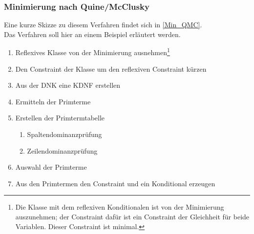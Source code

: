 \documentclass[draft]{scrreprt}
\begin{document}
\subsubsection{Minimierung nach Quine/McClusky} \label{Min_Besch_QMC} 
Eine kurze Skizze zu diesem Verfahren findet sich in \ref{Min_QMC}.\\
Das Verfahren soll hier an einem Beispiel erläutert werden.
\begin{enumerate}
	\item Reflexives Klasse von der Minimierung ausnehmen\footnote{Die Klasse mit dem reflexiven Konditionalen ist von der Minimierung auszunehmen; der Constraint dafür ist ein Constraint der Gleichheit für beide Variablen. Dieser Constraint ist minimal.}
	\item Den Constraint der Klasse um den reflexiven Constraint kürzen
	\item Aus der DNK eine KDNF erstellen 
	\item Ermitteln der Primterme
	\item Erstellen der Primtermtabelle
	\begin{enumerate}
		\item Spaltendominanzprüfung
		\item Zeilendominanzprüfung
	\end{enumerate}
	\item Auswahl der Primterme
	\item Aus den Primtermen den Constraint und ein Konditional erzeugen	
\end{enumerate}
\end{document}
